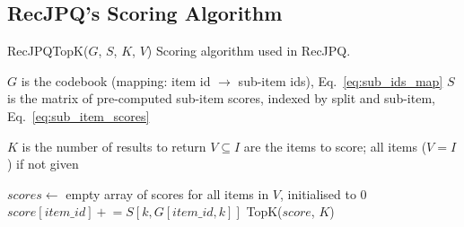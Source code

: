 \documentclass[sigconf,natbib=true, review=true]{acmart} %
\newcommand{\pluseq}{\mathrel{+}=}
\begin{document}
\subsection{RecJPQ's Scoring Algorithm}
\begin{algorithm}[h]
\small
\caption{RecJPQTopK($G$, $S$, $K$, $V$) Scoring algorithm used in RecJPQ.}\label{alg:top_k}
\begin{algorithmic}[1]
   \Require $G$ is the codebook (mapping: item id $\rightarrow$ sub-item ids), Eq.~\eqref{eq:sub_ids_map}
   \Require $S$ is the matrix of pre-computed sub-item scores, indexed by split and sub-item, Eq.~\eqref{eq:sub_item_scores}

    

   \Require $K$ is the number of results to return
   \Require $V \subseteq I$ are the items to score; all items ($V = I$)  if not given 
   
   \State $scores \gets$ empty array of scores for all items in $V$, initialised to 0
    
            \State $score[item\_id]  \pluseq S[k,G[item\_id,k]] $ 
        \EndFor
   \EndFor
   \State \Return TopK($score$, $K$) 
\end{algorithmic}
\end{algorithm}
\end{document}
